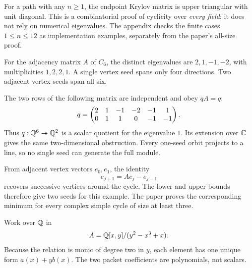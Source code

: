For a path with any $n\ge1$, the endpoint Krylov matrix is upper triangular with unit diagonal. This is a combinatorial proof of cyclicity over \emph{every field}; it does not rely on numerical eigenvalues. The appendix checks the finite cases $1\le n\le12$ as implementation examples, separately from the paper's all-size proof.


For the adjacency matrix $A$ of $C_6$, the distinct eigenvalues are $2,1,-1,-2$, with multiplicities $1,2,2,1$. A single vertex seed spans only four directions. Two adjacent vertex seeds span all six.


The two rows of the following matrix are independent and obey $qA=q$:
\[
q=\begin{pmatrix}2&1&-1&-2&-1&1\\0&1&1&0&-1&-1\end{pmatrix}.
\]
Thus $q:\mathbb Q^6\twoheadrightarrow\mathbb Q^2$ is a scalar quotient for the eigenvalue $1$. Its extension over $\mathbb C$ gives the same two-dimensional obstruction. Every one-seed orbit projects to a line, so no single seed can generate the full module.

From adjacent vertex vectors $e_0,e_1$, the identity
\[
e_{j+1}=Ae_j-e_{j-1}
\]
recovers successive vertices around the cycle. The lower and upper bounds therefore give two seeds for this example. The paper proves the corresponding minimum for every complex simple cycle of size at least three.


Work over $\mathbb Q$ in
\[
A=\mathbb Q[x,y]/(y^2-x^3+x).
\]
Because the relation is monic of degree two in $y$, each element has one unique form $a(x)+yb(x)$. The two packet coefficients are polynomials, not scalars.

